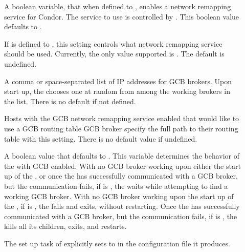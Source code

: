 \begin{description}

\item[] 
  \label{param:NetRemapEnable}
  A boolean variable, that when defined to , enables a network 
  remapping service for Condor.
  The service to use is controlled by .
  This boolean value defaults to .

\item[]
  \label{param:NetRemapService}
  If  is
  defined to , this setting controls what network remapping
  service should be used.
  Currently, the only value supported is \verb@GCB@.
  The default is undefined.

\item[]
  \label{param:NetRemapInagent}
  A comma or space-separated list of IP addresses for GCB brokers.
  Upon start up, the  chooses one at random from
  among the working brokers in the list.
  There is no default if not defined.

\item[]
  \label{param:NetRemapRoute}
  Hosts with the GCB network remapping service enabled that would like
  to use a GCB routing table 
  GCB broker specify
  the full path to their routing table with this setting.
  There is no default value if undefined.

\item[]
  \label{param:MasterWaitsForGCBBroker}
  A boolean value that defaults to .
  This variable determines the behavior of the 
  with GCB enabled.
  With no GCB broker working upon either the start up of the , 
  or once the  has successfully communicated with a
  GCB broker, but the communication fails,
  if  is ,
  the  waits while attempting to find a
  working GCB broker.
  With no GCB broker working upon the start up of the , 
  if  is ,
  the  fails and exits, without restarting.
  Once the  has successfully communicated with a
  GCB broker, but the communication fails,
  if  is ,
  the  kills all its children, exits, and restarts.

  The set up task of  explicitly sets
   to  in the
  configuration file it produces.

\end{description}

